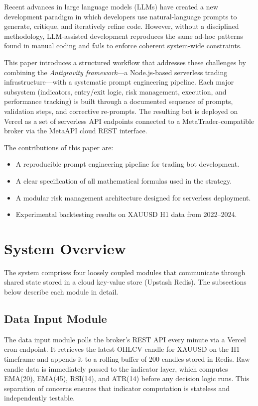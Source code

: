 \documentclass[conference]{IEEEtran}
\begin{document}
Recent advances in large language models (LLMs) have created a new
development paradigm in which developers use natural-language prompts
to generate, critique, and iteratively refine code.  However, without
a disciplined methodology, LLM-assisted development reproduces the
same ad-hoc patterns found in manual coding and fails to enforce
coherent system-wide constraints.

This paper introduces a structured workflow that addresses these
challenges by combining the \textit{Antigravity framework}---a
Node.js-based serverless trading infrastructure---with a systematic
prompt engineering pipeline.  Each major subsystem (indicators,
entry/exit logic, risk management, execution, and performance
tracking) is built through a documented sequence of prompts,
validation steps, and corrective re-prompts.  The resulting bot is
deployed on Vercel as a set of serverless API endpoints connected to a
MetaTrader-compatible broker via the MetaAPI cloud REST interface.

The contributions of this paper are:
\begin{itemize}
  \item A reproducible prompt engineering pipeline for trading bot
        development.
  \item A clear specification of all mathematical formulas used in
        the strategy.
  \item A modular risk management architecture designed for serverless
        deployment.
  \item Experimental backtesting results on XAUUSD H1 data from
        2022--2024.
\end{itemize}

\section{System Overview}

The system comprises four loosely coupled modules that communicate
through shared state stored in a cloud key-value store (Upstash
Redis).  The subsections below describe each module in detail.

\subsection{Data Input Module}

The data input module polls the broker's REST API every minute via a
Vercel cron endpoint.  It retrieves the latest OHLCV candle for
XAUUSD on the H1 timeframe and appends it to a rolling buffer of 200
candles stored in Redis.  Raw candle data is immediately passed to the
indicator layer, which computes EMA(20), EMA(45), RSI(14), and ATR(14)
before any decision logic runs.  This separation of concerns ensures
that indicator computation is stateless and independently testable.
\end{document}
